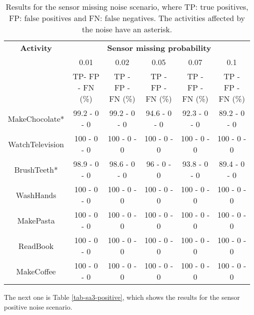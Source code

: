 \begin{table}[htbp]\scriptsize
  \begin{center}
        \begin{tabular}{cccccc}
            \hline            
            \textbf{Activity} & \multicolumn{5}{c}{\textbf{Sensor missing probability}}\\
             & 0.01 & 0.02 & 0.05 & 0.07 & 0.1 \\
             & TP- FP - FN (\%) & TP - FP - FN (\%) & TP - FP - FN (\%) & TP - FP - FN (\%) & TP - FP - FN (\%)\\
            \hline
            MakeChocolate*   & 99.2 - 0 - 0 & 99.2 - 0 - 0 & 94.6 - 0 - 0 & 92.3 - 0 - 0 & 89.2 - 0 - 0 \\
	    WatchTelevision  & 100 - 0 - 0 & 100 - 0 - 0 & 100 - 0 - 0 & 100 - 0 - 0 & 100 - 0 - 0 \\
	    BrushTeeth*      & 98.9 - 0 - 0 & 98.6 - 0 - 0 & 96 - 0 - 0 & 93.8 - 0 - 0 & 89.4 - 0 - 0 \\
	    WashHands        & 100 - 0 - 0 & 100 - 0 - 0 & 100 - 0 - 0 & 100 - 0 - 0 & 100 - 0 - 0 \\
	    MakePasta        & 100 - 0 - 0 & 100 - 0 - 0 & 100 - 0 - 0 & 100 - 0 - 0 & 100 - 0 - 0 \\
	    ReadBook         & 100 - 0 - 0 & 100 - 0 - 0 & 100 - 0 - 0 & 100 - 0 - 0 & 100 - 0 - 0 \\
	    MakeCoffee       & 100 - 0 - 0 & 100 - 0 - 0 & 100 - 0 - 0 & 100 - 0 - 0 & 100 - 0 - 0 \\
            \hline
        \end{tabular}                
        \caption{Results for the sensor missing noise scenario, where TP: true positives, FP: false positives and FN: false negatives. The activities affected by the noise have an asterisk.}
        \label{tab-sa3-missing}
    \end{center}
\end{table}

The next one is Table \ref{tab-sa3-positive}, which shows the results for the sensor positive noise scenario.


